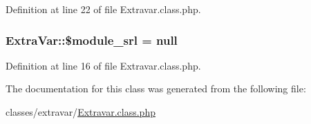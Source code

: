 Definition at line 22 of file Extravar.\+class.\+php.

\hypertarget{classExtraVar_a3a84e48f2cdf01660b2844244f8fd9f7}{
\subsubsection[{\$module\+\_\+srl}]{\setlength{\rightskip}{0pt plus 5cm}Extra\+Var\+::\$module\+\_\+srl = null}}\label{classExtraVar_a3a84e48f2cdf01660b2844244f8fd9f7}


Definition at line 16 of file Extravar.\+class.\+php.



The documentation for this class was generated from the following file\+:\begin{DoxyCompactItemize}
\item 
classes/extravar/\hyperlink{Extravar_8class_8php}{Extravar.\+class.\+php}\end{DoxyCompactItemize}
